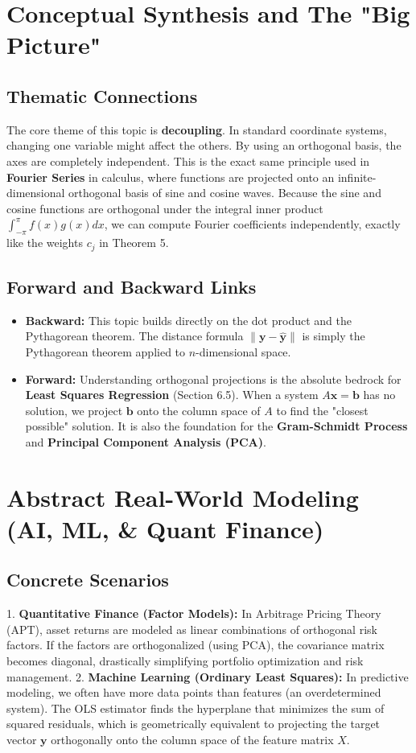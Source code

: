 \documentclass[11pt, letterpaper]{article}
\theoremstyle{definition}
\theoremstyle{remark}
\begin{document}
\newpage
\section{Conceptual Synthesis and The "Big Picture"}

\subsection{Thematic Connections}
The core theme of this topic is \textbf{decoupling}. In standard coordinate systems, changing one variable might affect the others. By using an orthogonal basis, the axes are completely independent. This is the exact same principle used in \textbf{Fourier Series} in calculus, where functions are projected onto an infinite-dimensional orthogonal basis of sine and cosine waves. Because the sine and cosine functions are orthogonal under the integral inner product $\int_{-\pi}^{\pi} f(x)g(x) dx$, we can compute Fourier coefficients independently, exactly like the weights $c_j$ in Theorem 5.

\subsection{Forward and Backward Links}
\begin{itemize}
    \item \textbf{Backward:} This topic builds directly on the dot product and the Pythagorean theorem. The distance formula $\|\mathbf{y} - \hat{\mathbf{y}}\|$ is simply the Pythagorean theorem applied to $n$-dimensional space.
    \item \textbf{Forward:} Understanding orthogonal projections is the absolute bedrock for \textbf{Least Squares Regression} (Section 6.5). When a system $A\mathbf{x} = \mathbf{b}$ has no solution, we project $\mathbf{b}$ onto the column space of $A$ to find the "closest possible" solution. It is also the foundation for the \textbf{Gram-Schmidt Process} and \textbf{Principal Component Analysis (PCA)}.
\end{itemize}

\section{Abstract Real-World Modeling (AI, ML, \& Quant Finance)}

\subsection{Concrete Scenarios}
1. \textbf{Quantitative Finance (Factor Models):} In Arbitrage Pricing Theory (APT), asset returns are modeled as linear combinations of orthogonal risk factors. If the factors are orthogonalized (using PCA), the covariance matrix becomes diagonal, drastically simplifying portfolio optimization and risk management.
2. \textbf{Machine Learning (Ordinary Least Squares):} In predictive modeling, we often have more data points than features (an overdetermined system). The OLS estimator finds the hyperplane that minimizes the sum of squared residuals, which is geometrically equivalent to projecting the target vector $\mathbf{y}$ orthogonally onto the column space of the feature matrix $X$.
\end{document}

